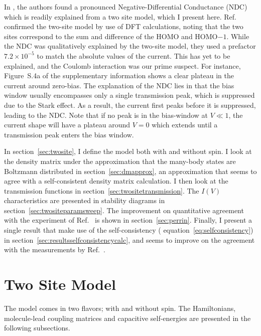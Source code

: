 In \citet{perrinnano}, the authors found a pronounced Negative-Differential Conductance (NDC) which is readily explained from a two site model, which I present here. Ref.~\cite{perrinnano} confirmed the two-site model by use of DFT calculations, noting that the two sites correspond to the sum and difference of the HOMO and HOMO$-1$. While the NDC was qualitatively explained by the two-site model, they used a prefactor $7.2 \times 10^{-5}$ to match the absolute values of the current. This has yet to be explained, and the Coulomb interaction was our prime suspect. For instance, Figure~S.4a of the supplementary information shows a clear plateau in the current around zero-bias.  The explanation of the NDC lies in that the bias window usually encompasses only a single transmission peak, which is suppressed due to the Stark effect. As a result, the current first peaks before it is suppressed, leading to the NDC. Note that if no peak is in the bias-window at $V\ll1$, the current shape will have a plateau around $V=0$ which extends until a transmission peak enters the bias window. 

In section~\ref{sec:twosite}, I define the model both with and without spin. I look at the density matrix under the approximation that the many-body states are Boltzmann distributed in section~\ref{sec:dmapprox}, an approximation that seems to agree with a self-consistent density matrix calculation. I then look at the transmission functions in section~\ref{sec:twositetransmission}. The $I(V)$ characteristics  are presented in stability diagrams in section~\ref{sec:twositeparamsweep}. The improvement on quantitative agreement with the experiment of Ref.~\cite{perrinnano} is shown in section~\ref{sec:perrin}. Finally, I present a single result that make use of the self-consistency ( equation~\ref{eq:selfconsistency}) in section~\ref{sec:resultsselfconsistencycalc}, and seems to improve on the agreement with the measurements by Ref.~\cite{perrinnano}.


\section{Two Site Model} 
The model comes in two flavors; with and without spin. The Hamiltonians, molecule-lead coupling matrices and capacitive self-energies are presented in the following subsections.
\label{sec:twosite}
